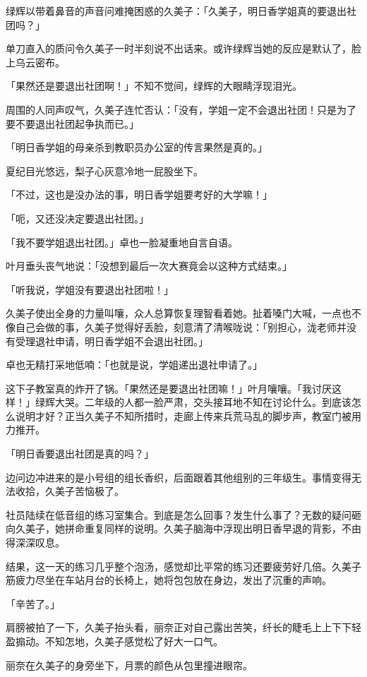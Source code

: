 \documentclass[UTF8]{ctexart}
\begin{document}
    绿辉以带着鼻音的声音问难掩困惑的久美子：「久美子，明日香学姐真的要退出社团吗？」 

    单刀直入的质问令久美子一时半刻说不出话来。或许绿辉当她的反应是默认了，脸上乌云密布。 

    「果然还是要退出社团啊！」不知不觉间，绿辉的大眼睛浮现泪光。 

    周围的人同声叹气，久美子连忙否认：「没有，学姐一定不会退出社团！只是为了要不要退出社团起争执而已。」 

    「明日香学姐的母亲杀到教职员办公室的传言果然是真的。」 

    夏纪目光悠远，梨子心灰意冷地一屁股坐下。 

    「不过，这也是没办法的事，明日香学姐要考好的大学嘛！」 

    「呃，又还没决定要退出社团。」 

    「我不要学姐退出社团。」卓也一脸凝重地自言自语。 

    叶月垂头丧气地说：「没想到最后一次大赛竟会以这种方式结束。」 

    「听我说，学姐没有要退出社团啦！」 

    久美子使出全身的力量叫嚷，众人总算恢复理智看着她。扯着嗓门大喊，一点也不像自己会做的事，久美子觉得好丢脸，刻意清了清喉咙说：「别担心，泷老师并没有受理退社申请，明日香学姐不会退出社团。」 

    卓也无精打采地低喃：「也就是说，学姐递出退社申请了。」 

    这下子教室真的炸开了锅。「果然还是要退出社团嘛！」叶月嚷嚷。「我讨厌这样！」绿辉大哭。二年级的人都一脸严肃，交头接耳地不知在讨论什么。到底该怎么说明才好？正当久美子不知所措时，走廊上传来兵荒马乱的脚步声，教室门被用力推开。 

    「明日香要退出社团是真的吗？」 

    边问边冲进来的是小号组的组长香织，后面跟着其他组别的三年级生。事情变得无法收拾，久美子苦恼极了。 

    社员陆续在低音组的练习室集合。到底是怎么回事？发生什么事了？无数的疑问砸向久美子，她拼命重复同样的说明。久美子脑海中浮现出明日香早退的背影，不由得深深叹息。 

    结果，这一天的练习几乎整个泡汤，感觉却比平常的练习还要疲劳好几倍。久美子筋疲力尽坐在车站月台的长椅上，她将包包放在身边，发出了沉重的声响。 

    「辛苦了。」 

    肩膀被拍了一下，久美子抬头看，丽奈正对自己露出苦笑，纤长的睫毛上上下下轻盈搧动。不知怎地，久美子感觉松了好大一口气。 

    丽奈在久美子的身旁坐下，月票的颜色从包里撞进眼帘。 
\end{document}
